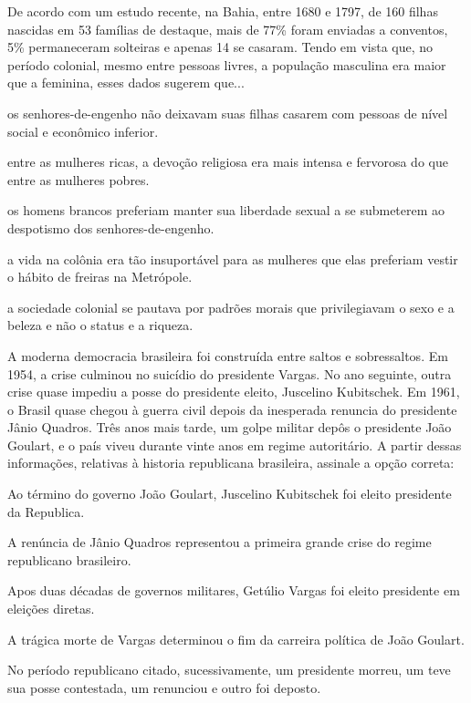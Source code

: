 \questao %
De acordo com um estudo recente, na Bahia, entre 1680 e 1797, de 160 filhas nascidas em 53 famílias de destaque, mais de 77\% foram enviadas a conventos, 5\% permaneceram solteiras e apenas 14 se casaram. Tendo em vista que, no período colonial, mesmo entre pessoas livres, a população masculina era maior que a feminina, esses dados sugerem que...
\begin{alternativas}
\item os senhores-de-engenho não deixavam suas filhas casarem com pessoas de nível social e econômico inferior. 
\item entre as mulheres ricas, a devoção religiosa era mais intensa e fervorosa do que entre as mulheres pobres. 
\item os homens brancos preferiam manter sua liberdade sexual a se submeterem ao despotismo dos senhores-de-engenho.
\item a vida na colônia era tão insuportável para as mulheres que elas preferiam vestir o hábito de freiras na Metrópole.
\item a sociedade colonial se pautava por padrões morais que privilegiavam o sexo e a beleza e não o status e a riqueza.
\end{alternativas}

\questao %
A moderna democracia brasileira foi construída entre saltos e sobressaltos. Em 1954, a crise culminou no suicídio do presidente Vargas. No ano seguinte, outra crise quase impediu a posse do presidente eleito, Juscelino Kubitschek. Em 1961, o Brasil quase chegou à guerra civil depois da inesperada renuncia do presidente Jânio Quadros. Três anos mais tarde, um golpe militar depôs o presidente João Goulart, e o país viveu durante vinte anos em regime autoritário. A partir dessas informações, relativas à historia republicana brasileira, assinale a opção correta:
\begin{alternativas}
\item Ao término do governo João Goulart, Juscelino Kubitschek foi eleito presidente da Republica. 
\item A renúncia de Jânio Quadros representou a primeira grande crise do regime republicano brasileiro. 
\item Apos duas décadas de governos militares, Getúlio Vargas foi eleito presidente em eleições diretas.
\item A trágica morte de Vargas determinou o fim da carreira política de João Goulart.
\item No período republicano citado, sucessivamente, um presidente morreu, um teve sua posse contestada, um renunciou e outro foi deposto.
\end{alternativas}

